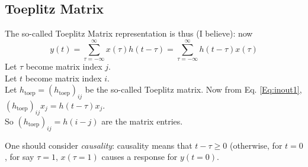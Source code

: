 \documentclass[twoside]{amsart}
\theoremstyle{plain}
\theoremstyle{definition}
\theoremstyle{remark}
\numberwithin{equation}{section}
\begin{document}
\subsection*{Toeplitz Matrix}

The so-called Toeplitz Matrix representation is thus (I believe): now
\begin{equation}\label{Eq:inout1}
y(t) = \sum_{\tau=-\infty}^{\infty} x(\tau) h(t-\tau) = \sum_{\tau=-\infty}^{\infty}h(t-\tau)x(\tau)
\end{equation}
Let $\tau$ become matrix index $j$.  \\
Let $t$ become matrix index $i$.  \\
Let $h_{\text{toep}} = (h_{\text{toep}})_{ij}$ be the so-called Toeplitz matrix.  Now from Eq. \ref{Eq:inout1}, \\
$(h_{\text{toep}})_{ij}x_j = h(t-\tau)x_j$. \\

So $(h_{\text{toep}})_{ij} = h(i-j)$ are the matrix entries.  

One should consider \emph{causality}: causality means that $t-\tau \geq 0$ (otherwise, for $t=0$, for say $\tau=1$, $x(\tau=1)$ causes a response for $y(t=0)$.  
\end{document}
